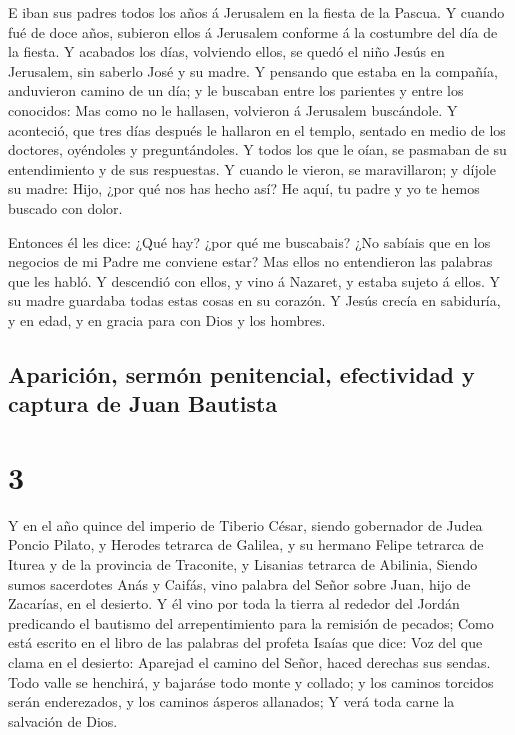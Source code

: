  E iban sus padres todos los años á Jerusalem en la
fiesta de la Pascua.  Y cuando fué de doce años, subieron
ellos á Jerusalem conforme á la costumbre del día de la fiesta.
 Y acabados los días, volviendo ellos, se quedó el niño
Jesús en Jerusalem, sin saberlo José y su madre.  Y
pensando que estaba en la compañía, anduvieron camino de un día; y le
buscaban entre los parientes y entre los conocidos:  Mas
como no le hallasen, volvieron á Jerusalem buscándole.  Y
aconteció, que tres días después le hallaron en el templo, sentado en
medio de los doctores, oyéndoles y preguntándoles.  Y
todos los que le oían, se pasmaban de su entendimiento y de sus
respuestas.  Y cuando le vieron, se maravillaron; y
díjole su madre: Hijo, ¿por qué nos has hecho así? He aquí, tu padre y
yo te hemos buscado con dolor.

 Entonces él les dice: ¿Qué hay? ¿por qué me buscabais?
¿No sabíais que en los negocios de mi Padre me conviene estar?
 Mas ellos no entendieron las palabras que les habló.
 Y descendió con ellos, y vino á Nazaret, y estaba sujeto
á ellos. Y su madre guardaba todas estas cosas en su corazón.
 Y Jesús crecía en sabiduría, y en edad, y en gracia para
con Dios y los hombres.

\hypertarget{apariciuxf3n-sermuxf3n-penitencial-efectividad-y-captura-de-juan-bautista}{%
\subsection{Aparición, sermón penitencial, efectividad y captura de Juan
Bautista}\label{apariciuxf3n-sermuxf3n-penitencial-efectividad-y-captura-de-juan-bautista}}

\hypertarget{section-42-3}{%
\section{3}\label{section-42-3}}

 Y en el año quince del imperio de Tiberio César, siendo
gobernador de Judea Poncio Pilato, y Herodes tetrarca de Galilea, y su
hermano Felipe tetrarca de Iturea y de la provincia de Traconite, y
Lisanias tetrarca de Abilinia,  Siendo sumos sacerdotes
Anás y Caifás, vino palabra del Señor sobre Juan, hijo de Zacarías, en
el desierto.  Y él vino por toda la tierra al rededor del
Jordán predicando el bautismo del arrepentimiento para la remisión de
pecados;  Como está escrito en el libro de las palabras
del profeta Isaías que dice: Voz del que clama en el desierto: Aparejad
el camino del Señor, haced derechas sus sendas.  Todo
valle se henchirá, y bajaráse todo monte y collado; y los caminos
torcidos serán enderezados, y los caminos ásperos allanados;
 Y verá toda carne la salvación de Dios.

